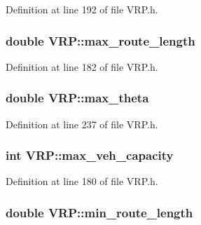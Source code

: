 Definition at line 192 of file VRP.h.

\hypertarget{class_v_r_p_a8884ecddc6d2592162c012b284df672a}{
\subsubsection[{max\_\-route\_\-length}]{\setlength{\rightskip}{0pt plus 5cm}double {\bf VRP::max\_\-route\_\-length}}}
\label{class_v_r_p_a8884ecddc6d2592162c012b284df672a}


Definition at line 182 of file VRP.h.

\hypertarget{class_v_r_p_a99bfad6795281816b4036ad42a900b3d}{
\subsubsection[{max\_\-theta}]{\setlength{\rightskip}{0pt plus 5cm}double {\bf VRP::max\_\-theta}}}
\label{class_v_r_p_a99bfad6795281816b4036ad42a900b3d}


Definition at line 237 of file VRP.h.

\hypertarget{class_v_r_p_ae6557cfbba614dc5d75567a7e0abf099}{
\subsubsection[{max\_\-veh\_\-capacity}]{\setlength{\rightskip}{0pt plus 5cm}int {\bf VRP::max\_\-veh\_\-capacity}}}
\label{class_v_r_p_ae6557cfbba614dc5d75567a7e0abf099}


Definition at line 180 of file VRP.h.

\hypertarget{class_v_r_p_a4e20cf6dd60c29bd004d4160f93bdb98}{
\subsubsection[{min\_\-route\_\-length}]{\setlength{\rightskip}{0pt plus 5cm}double {\bf VRP::min\_\-route\_\-length}}}
\label{class_v_r_p_a4e20cf6dd60c29bd004d4160f93bdb98}


